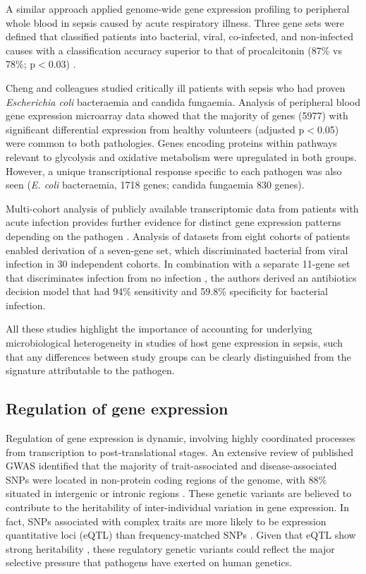 A similar approach applied genome-wide gene expression profiling to peripheral whole blood in sepsis caused by acute respiratory illness. Three gene sets were defined that classified patients into bacterial, viral, co-infected, and non-infected causes with a classification accuracy superior to that of procalcitonin (87\% vs 78\%; p$<$0.03) \parencite{Tsalik2016}. 

Cheng and colleagues \parencite{Cheng2016} studied critically ill patients with sepsis who had proven \textit{Escherichia coli} bacteraemia and candida fungaemia. Analysis of peripheral blood gene expression microarray data showed that the majority of genes (5977) with significant differential expression from healthy volunteers (adjusted p$<$0.05) were common to both pathologies. Genes encoding proteins within pathways relevant to glycolysis and oxidative metabolism were upregulated in both groups. However, a unique transcriptional response specific to each pathogen was also seen (\textit{E. coli} bacteraemia, 1718 genes; candida fungaemia 830 genes). 

Multi-cohort analysis of publicly available transcriptomic data from patients with acute infection provides further evidence for distinct gene expression patterns depending on the pathogen \parencite{Sweeney2016}. Analysis of datasets from eight cohorts of patients enabled derivation of a seven-gene set, which discriminated bacterial from viral infection in 30 independent cohorts. In combination with a separate 11-gene set that discriminates infection from no infection \parencite{Sweeney2015}, the authors derived an antibiotics decision model that had 94\% sensitivity and 59.8\% specificity for bacterial infection. 

All these studies highlight the importance of accounting for underlying microbiological heterogeneity in studies of host gene expression in sepsis, such that any differences between study groups can be clearly distinguished from the signature attributable to the pathogen. 

\subsection{Regulation of gene expression}
Regulation of gene expression is dynamic, involving highly coordinated processes from transcription to post-translational stages. An extensive review of published GWAS identified that the majority of trait-associated and disease-associated SNPs were located in non-protein coding regions of the genome, with 88\% situated in intergenic or intronic regions \parencite{Hindorff2009}. These genetic variants are believed to contribute to the heritability of inter-individual variation in gene expression. In fact, SNPs associated with complex traits are more likely to be expression quantitative loci (eQTL) than frequency-matched SNPs \parencite{Nicolae2010}. Given that eQTL show strong heritability \parencite{Wright2014}, these regulatory genetic variants could reflect the major selective pressure that pathogens have exerted on human genetics. 

